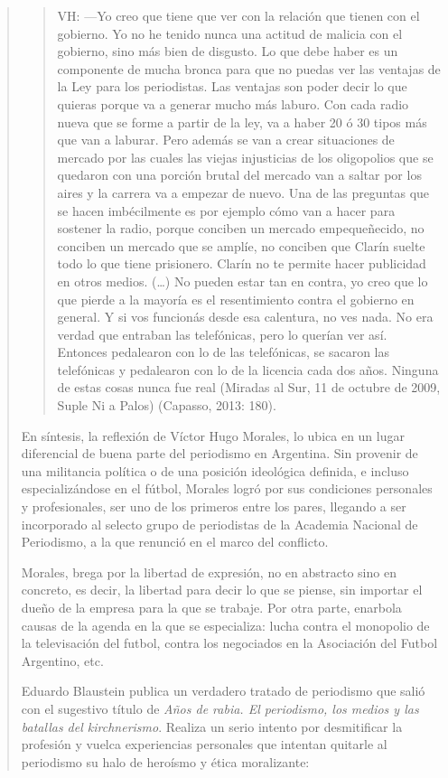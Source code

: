 \begin{quote}
\begin{quote}
	VH: ---Yo creo que tiene que ver con la relación que tienen con el gobierno. Yo no he tenido nunca una actitud de malicia con el gobierno, sino más bien de disgusto. Lo que debe haber es un componente de mucha bronca para que no puedas ver las ventajas de la Ley para los periodistas. Las ventajas son poder decir lo que quieras porque va a generar mucho más laburo. Con cada radio nueva que se forme a partir de la ley, va a haber 20 ó 30 tipos más que van a laburar. Pero además se van a crear situaciones de mercado por las cuales las viejas injusticias de los oligopolios que se quedaron con una porción brutal del mercado van a saltar por los aires y la carrera va a empezar de nuevo. Una de las preguntas que se hacen imbécilmente es por ejemplo cómo van a hacer para sostener la radio, porque conciben un mercado empequeñecido, no conciben un mercado que se amplíe, no conciben que Clarín suelte todo lo que tiene prisionero. Clarín no te permite hacer publicidad en otros medios. (\dots) No pueden estar tan en contra, yo creo que lo que pierde a la mayoría es el resentimiento contra el gobierno en general. Y si vos funcionás desde esa calentura, no ves nada. No era verdad que entraban las telefónicas, pero lo querían ver así. Entonces pedalearon con lo de las telefónicas, se sacaron las telefónicas y pedalearon con lo de la licencia cada dos años. Ninguna de estas cosas nunca fue real (Miradas al Sur, 11 de octubre de 2009, Suple Ni a Palos) (Capasso, 2013: 180).
\end{quote}


En síntesis, la reflexión de Víctor Hugo Morales, lo ubica en un lugar diferencial de buena parte del periodismo en Argentina. Sin provenir de una militancia política o de una posición ideológica definida, e incluso especializándose en el fútbol, Morales logró por sus condiciones personales y profesionales, ser uno de los primeros entre los pares, llegando a ser incorporado al selecto grupo de periodistas de la Academia Nacional de Periodismo, a la que renunció en el marco del conflicto.

Morales, brega por la libertad de expresión, no en abstracto sino en concreto, es decir, la libertad para decir lo que se piense, sin importar el dueño de la empresa para la que se trabaje. Por otra parte, enarbola causas de la agenda en la que se especializa: lucha contra el monopolio de la televisación del futbol, contra los negociados en la Asociación del Futbol Argentino, etc.

Eduardo Blaustein publica un verdadero tratado de periodismo que salió con el sugestivo título de \emph{Años de rabia. El periodismo, los medios y las batallas del kirchnerismo}. Realiza un serio intento por desmitificar la profesión y vuelca experiencias personales que intentan quitarle al periodismo su halo de heroísmo y ética moralizante:


\end{quote}
